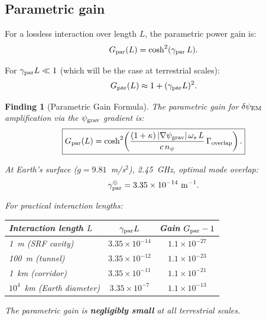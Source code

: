 \documentclass[11pt]{article}
\newtheorem{finding}{Finding}
\newcommand{\ee}[1]{\times 10^{#1}}
\newcommand{\psigrav}{\psi_{\rm grav}}
\newcommand{\dpsiEM}{\delta\psi_{\rm EM}}
\newcommand{\npsi}{n_\psi}
\begin{document}
\subsection{Parametric gain}

For a lossless interaction over length $L$, the parametric power gain is:
\begin{equation}
G_{\rm par}(L) = \cosh^2(\gamma_{\rm par}\,L).
\label{eq:gain-cosh}
\end{equation}

For $\gamma_{\rm par}L \ll 1$ (which will be the case at terrestrial
scales):
\begin{equation}
G_{\rm par}(L) \approx 1 + (\gamma_{\rm par}L)^2.
\label{eq:gain-small}
\end{equation}

\begin{finding}[Parametric Gain Formula]
\label{find:parametric-gain}
The parametric gain for $\dpsiEM$ amplification via the $\psigrav$
gradient is:
\begin{equation}
\boxed{
G_{\rm par}(L) = \cosh^2\!\left(
\frac{(1+\kappa)\,|\nabla\psigrav|\,\omega_s\,L}{c\,\npsi}
\,\Gamma_{\rm overlap}\right).
}
\label{eq:gain-formula}
\end{equation}

At Earth's surface ($g = 9.81$~m/s$^2$), 2.45~GHz, optimal mode overlap:
\begin{equation}
\gamma_{\rm par}^{\oplus} = 3.35\ee{-14}~\text{m}^{-1}.
\end{equation}

For practical interaction lengths:
\begin{center}
\begin{tabular}{lcc}
\toprule
Interaction length $L$ & $\gamma_{\rm par}L$ & Gain $G_{\rm par} - 1$ \\
\midrule
1~m (SRF cavity) & $3.35\ee{-14}$ & $1.1\ee{-27}$ \\
100~m (tunnel) & $3.35\ee{-12}$ & $1.1\ee{-23}$ \\
1~km (corridor) & $3.35\ee{-11}$ & $1.1\ee{-21}$ \\
$10^4$~km (Earth diameter) & $3.35\ee{-7}$ & $1.1\ee{-13}$ \\
\bottomrule
\end{tabular}
\end{center}

The parametric gain is \textbf{negligibly small} at all terrestrial scales.
\end{finding}
\end{document}
